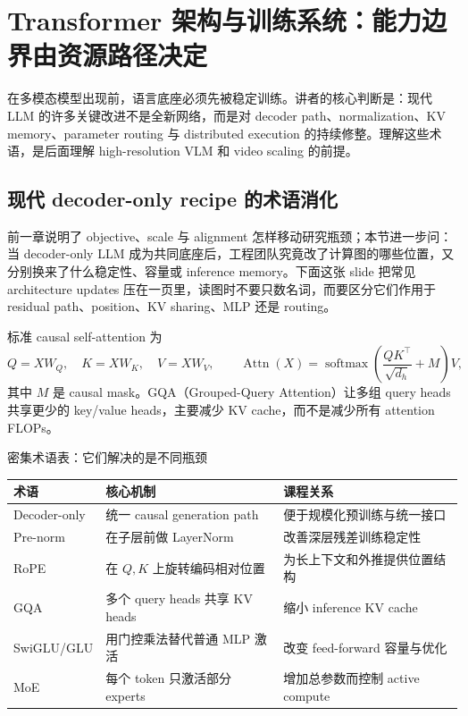 \section{Transformer 架构与训练系统：能力边界由资源路径决定}

在多模态模型出现前，语言底座必须先被稳定训练。讲者的核心判断是：现代 LLM 的许多关键改进不是全新网络，而是对 decoder path、normalization、KV memory、parameter routing 与 distributed execution 的持续修整。理解这些术语，是后面理解 high-resolution VLM 和 video scaling 的前提。

\subsection{现代 decoder-only recipe 的术语消化}

前一章说明了 objective、scale 与 alignment 怎样移动研究瓶颈；本节进一步问：当 decoder-only LLM 成为共同底座后，工程团队究竟改了计算图的哪些位置，又分别换来了什么稳定性、容量或 inference memory。下面这张 slide 把常见 architecture updates 压在一页里，读图时不要只数名词，而要区分它们作用于 residual path、position、KV sharing、MLP 还是 routing。


标准 causal self-attention 为
\[
Q=XW_Q,\quad K=XW_K,\quad V=XW_V,\qquad
\operatorname{Attn}(X)=\operatorname{softmax}\!\left(\frac{QK^\top}{\sqrt{d_h}}+M\right)V,
\]
其中 $M$ 是 causal mask。GQA（Grouped-Query Attention）让多组 query heads 共享更少的 key/value heads，主要减少 KV cache，而不是减少所有 attention FLOPs。

\begin{knowledgebox}{密集术语表：它们解决的是不同瓶颈}
\begin{tabularx}{\textwidth}{L{0.17\textwidth} L{0.30\textwidth} X}
\toprule
术语 & 核心机制 & 课程关系 \\
\midrule
Decoder-only & 统一 causal generation path & 便于规模化预训练与统一接口 \\
Pre-norm & 在子层前做 LayerNorm & 改善深层残差训练稳定性 \\
RoPE & 在 $Q,K$ 上旋转编码相对位置 & 为长上下文和外推提供位置结构 \\
GQA & 多个 query heads 共享 KV heads & 缩小 inference KV cache \\
SwiGLU/GLU & 用门控乘法替代普通 MLP 激活 & 改变 feed-forward 容量与优化 \\
MoE & 每个 token 只激活部分 experts & 增加总参数而控制 active compute \\
\bottomrule
\end{tabularx}
\end{knowledgebox}


